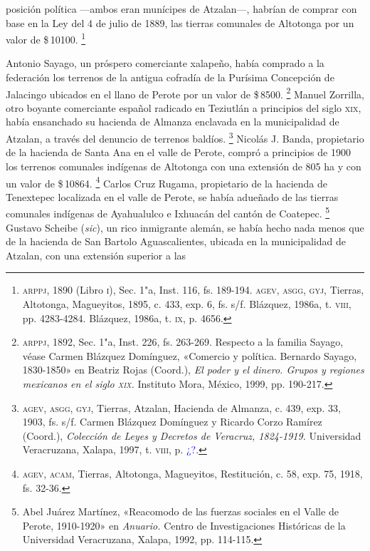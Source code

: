\documentclass[14pt,twoside,final]{extbook} %
\let\oldfootnote\footnote
\renewcommand\footnote[1]{%
\oldfootnote{\hspace{1mm}#1}}
\begin{document}
posición política ---ambos eran munícipes de Atzalan---, habrían de comprar con base en la Ley del 4 de julio de 1889, las tierras comunales de Altotonga por un valor de \$\,10100.\footnote{\textsc{arppj}, 1890 (Libro \textsc{i}), Sec. 1"a, Inst. 116, fs. 189-194. \textsc{agev, asgg, gyj}, Tierras, Altotonga, Magueyitos, 1895, c. 433, exp. 6, fs. s/f. Blázquez, 1986a, t. \textsc{viii}, pp. 4283-4284. Blázquez, 1986a, t. \textsc{ix}, p. 4656.}

Antonio Sayago, un próspero comerciante xalapeño, había comprado a la federación los terrenos de la antigua cofradía de la Purísima Concepción de Jalacingo ubicados en el llano de Perote por un valor de \$\,8500.\footnote{\textsc{arppj}, 1892, Sec. 1"a, Inst. 226, fs. 263-269. Respecto a la familia Sayago,\index[nombres]{Sayago!familia} véase Carmen Blázquez Domínguez, «Comercio y política. Bernardo Sayago, 1830-1850» en Beatriz Rojas (Coord.), \emph{El poder y el dinero. Grupos y regiones mexicanos en el siglo \textsc{xix}.} Instituto Mora, México, 1999, pp. 190-217.} Manuel Zorrilla, otro boyante comerciante español radicado en Teziutlán a principios del siglo \textsc{xix}, había ensanchado su hacienda de Almanza enclavada en la municipalidad de Atzalan, a través del denuncio de terrenos baldíos.\footnote{\textsc{agev, asgg, gyj}, Tierras, Atzalan, Hacienda de Almanza, c. 439, exp. 33, 1903, fs. s/f. Carmen Blázquez Domínguez y Ricardo Corzo Ramírez (Coord.), \emph{Colección de Leyes y Decretos de Veracruz, 1824-1919.} Universidad Veracruzana, Xalapa, 1997, t. \textsc{viii}, p. \textcolor{blue}{¿?}.} Nicolás J. Banda, propietario de la hacienda de Santa Ana en el valle de Perote, compró a principios de 1900 los terrenos comunales indígenas de Altotonga con una extensión de 805 ha y con un valor de \$\,10864.\footnote{\textsc{agev, acam}, Tierras, Altotonga, Magueyitos, Restitución, c. 58, exp. 75, 1918, fs. 32-36.} Carlos Cruz Rugama, propietario de la hacienda de Tenextepec localizada en el valle de Perote, se había adueñado de las tierras comunales indígenas de Ayahualulco e Ixhuacán del cantón de Coatepec.\footnote{Abel Juárez Martínez, «Reacomodo de las fuerzas sociales en el Valle de Perote, 1910-1920» en \textit{Anuario.} Centro de Investigaciones Históricas de la Universidad Veracruzana, Xalapa, 1992, pp. 114-115.} Gustavo Scheibe (\emph{sic}), un rico inmigrante alemán, se había hecho nada menos que de la hacienda de San Bartolo Aguascalientes, ubicada en la municipalidad de Atzalan, con una extensión superior a las 
\end{document}
